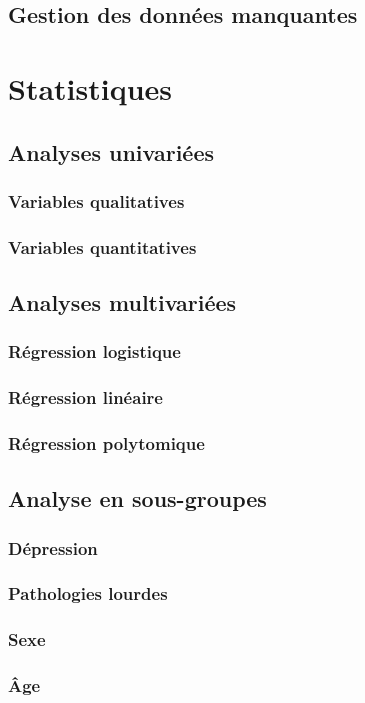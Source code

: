 \documentclass{book}
\begin{document}
\subsection{Gestion des données manquantes}

\newpage
\section{Statistiques}
\subsection{Analyses univariées}
\subsubsection{Variables qualitatives}
\subsubsection{Variables quantitatives}
\subsection{Analyses multivariées}
\subsubsection{Régression logistique}
\subsubsection{Régression linéaire}
\subsubsection{Régression polytomique}
\subsection{Analyse en sous-groupes}
\subsubsection{Dépression}
\subsubsection{Pathologies lourdes}
\subsubsection{Sexe}
\subsubsection{Âge}
\end{document}

